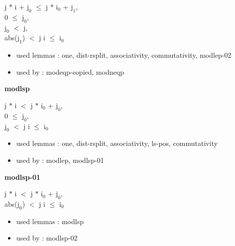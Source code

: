 \documentclass[a4paper]{article}
\begin{document}
\medskip

j $*$ i + $\mbox{j}_{0}$ $\le$ j $*$ $\mbox{i}_{0}$ + $\mbox{j}_{1}$, \\
0 $\le$ $\mbox{j}_{0}$, \\
$\mbox{j}_{0}$ $<$ j, \\
abs($\mbox{j}_{1}$) $<$ j \Fol i $\le$ $\mbox{i}_{0}$

\begin{itemize}


\item       used lemmas  : one, dist-rsplit, associativity, commutativity, modlep-02
\item       used by      : modeqp-copied, modneqp

\end{itemize}

\medskip

\bigskip

{\large\bf modlsp}

\medskip

j $*$ i $<$ j $*$ $\mbox{i}_{0}$ + $\mbox{j}_{0}$, \\
0 $\le$ $\mbox{j}_{0}$, \\
$\mbox{j}_{0}$ $<$ j \Fol i $\le$ $\mbox{i}_{0}$

\begin{itemize}


\item       used lemmas  : one, dist-rsplit, associativity, ls-pos, commutativity
\item       used by      : modlep, modlsp-01

\end{itemize}

\medskip

\bigskip

{\large\bf modlsp-01}

\medskip

j $*$ i $<$ j $*$ $\mbox{i}_{0}$ + $\mbox{j}_{0}$, \\
abs($\mbox{j}_{0}$) $<$ j \Fol i $\le$ $\mbox{i}_{0}$

\begin{itemize}


\item       used lemmas  : modlsp
\item       used by      : modlsp-02

\end{itemize}

\medskip

\bigskip
\end{document}
